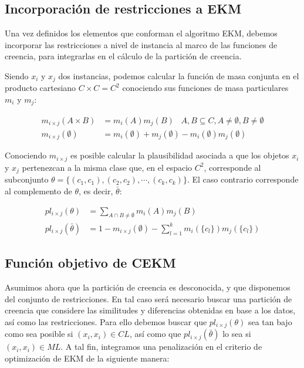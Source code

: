 \subsection{Incorporación de restricciones a EKM}

Una vez definidos los elementos que conforman el algoritmo \acs{EKM}, debemos incorporar las restricciones a nivel de instancia al marco de las funciones de creencia, para integrarlas en el cálculo de la partición de creencia.

Siendo $x_i$ y $x_j$ dos instancias, podemos calcular la función de masa conjunta en el producto cartesiano $C \times C = C^2$ conociendo sus funciones de masa particulares $m_i$ y $m_j$:

\begin{equation}
\begin{split}
m_{i \times j}(A \times B) &= m_i(A)m_j(B) \;\;\; A,B \subseteq C, A \neq \emptyset, B \neq \emptyset\\
m_{i \times j}(\emptyset) & = m_i(\emptyset) + m_j(\emptyset) - m_i(\emptyset)m_j(\emptyset)
\end{split}
\label{eqn21}
\end{equation}

Conociendo $ m_{i \times j} $ es posible calcular la plausibilidad asociada a que los objetos $x_i$ y $x_j$ pertenezcan a la misma clase que, en el espacio $C^2$, corresponde al subconjunto $\theta = \{(c_1, c_1), (c_2, c_2), \cdots, (c_k, c_k)\}$. El caso contrario corresponde al complemento de $\theta$, es decir, $\bar{\theta}$:

\begin{equation}
\begin{split}
pl_{i\times j}(\theta) &= \sum_{A \cap B \ne \emptyset}m_i(A)m_j(B)\\
pl_{i\times j}(\bar{\theta}) &= 1 - m_{i\times j}(\emptyset) - \sum_{l=1}^{k} m_i(\{c_l\})m_j(\{c_l\})
\end{split}
\label{eqn23}
\end{equation}

\subsection{Función objetivo de CEKM}

Asumimos ahora que la partición de creencia es desconocida, y que disponemos del conjunto de restricciones. En tal caso será necesario buscar una partición de creencia que considere las similitudes y diferencias obtenidas en base a los datos, así como las restricciones. Para ello debemos buscar que $pl_{i\times j} (\theta)$ sea tan bajo como sea posible si $(x_i, x_i) \in CL$, así como que $pl_{i\times j} (\bar{\theta})$ lo sea si $(x_i, x_i) \in ML$. A tal fin, integramos una penalización en el criterio de optimización de \acs{EKM} de la siguiente manera:

